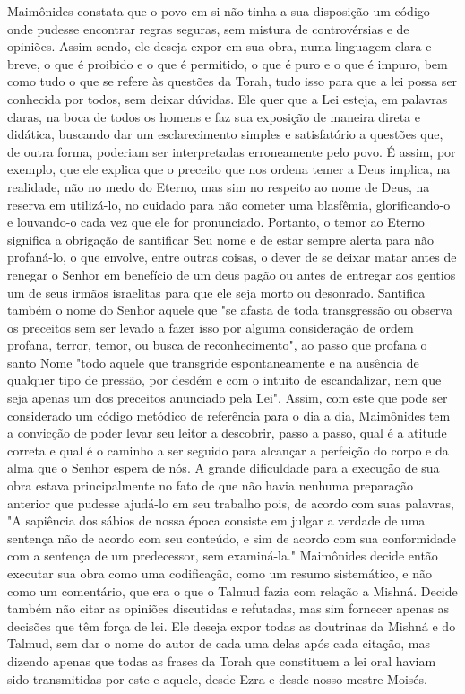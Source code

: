 \begin{itemize}
\begin{enumrate}
Maimônides constata que o povo em si não tinha a sua disposição um
código onde pudesse encontrar regras seguras, sem mistura de
controvér­sias e de opiniões. Assim sendo, ele deseja expor em sua obra,
numa linguagem clara e breve, o que é proibido e o que é permitido, o
que é puro e o que é impuro, bem como tudo o que se refere às questões
da Torah, tudo isso para que a lei possa ser conhecida por todos, sem
deixar dúvidas. Ele quer que a Lei esteja, em palavras claras, na boca
de todos os homens e faz sua exposição de maneira direta e didática,
buscando dar um esclarecimento simples e satisfa­tório a questões que,
de outra forma, poderiam ser interpretadas erroneamente pelo povo. É
assim, por exemplo, que ele explica que o preceito que nos orde­na temer
a Deus implica, na realidade, não no medo do Eterno, mas sim no respeito
ao nome de Deus, na reserva em utilizá-lo, no cuidado para não come­ter
uma blasfêmia, glorificando-o e louvando-o cada vez que ele for
pronuncia­do. Portanto, o temor ao Eterno significa a obrigação de
santificar Seu nome e de estar sempre alerta para não profaná-lo, o que
envolve, entre outras coi­sas, o dever de se deixar matar antes de
renegar o Senhor em benefício de um deus pagão ou antes de entregar aos
gentios um de seus irmãos israelitas para que ele seja morto ou
desonrado. Santifica também o nome do Senhor aquele que "se afasta de
toda transgressão ou observa os preceitos sem ser levado a fazer isso
por alguma consideração de ordem profana, terror, temor, ou busca de
reconhecimento", ao passo que profana o santo Nome "todo aquele que
transgride espontaneamente e na ausência de qualquer tipo de pressão,
por des­dém e com o intuito de escandalizar, nem que seja apenas um dos
preceitos anunciado pela Lei". Assim, com este que pode ser considerado
um código me­tódico de referência para o dia a dia, Maimônides tem a
convicção de poder levar seu leitor a descobrir, passo a passo, qual é a
atitude correta e qual é o caminho a ser seguido para alcançar a
perfeição do corpo e da alma que o Se­nhor espera de nós.
A grande dificuldade para a execução de sua obra estava principal­mente
no fato de que não havia nenhuma preparação anterior que pudesse
aju­dá-lo em seu trabalho pois, de acordo com suas palavras, "A
sapiência dos sá­bios de nossa época consiste em julgar a verdade de uma
sentença não de acor­do com seu conteúdo, e sim de acordo com sua
conformidade com a sentença de um predecessor, sem examiná-la."
Maimônides decide então executar sua obra como uma codificação, como um
resumo sistemático, e não como um co­mentário, que era o que o Talmud
fazia com relação a Mishná. Decide também não citar as opiniões
discutidas e refutadas, mas sim fornecer apenas as deci­sões que têm
força de lei. Ele deseja expor todas as doutrinas da Mishná e do Talmud,
sem dar o nome do autor de cada uma delas após cada citação, mas dizendo
apenas que todas as frases da Torah que constituem a lei oral haviam
sido transmitidas por este e aquele, desde Ezra e desde nosso mestre
Moisés.


\end{enumrate}
\end{itemize}
